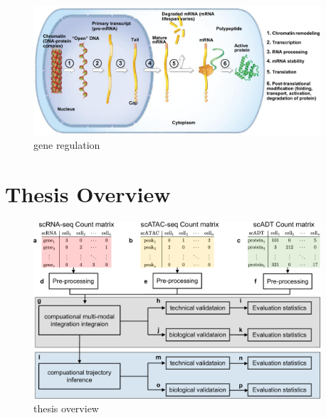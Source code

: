 \begin{figure}[!ht]
	\centering
	\includegraphics[width=0.95\textwidth]{gene_expression_process/fig}
	\vspace{0.1cm}
	\caption[gene regulation]{gene regulation}
	\label{fig:gene_expression_process}
\end{figure}

\section{Thesis Overview}
\label{introduction:sec2.overview}

\begin{figure}[!ht]
	\centering
	\includegraphics[width=0.95\textwidth]{thesis_overview/fig}
	\vspace{0.1cm}
	\caption[thesis overview]{thesis overview}
	\label{fig:thesis_overview}
\end{figure}

